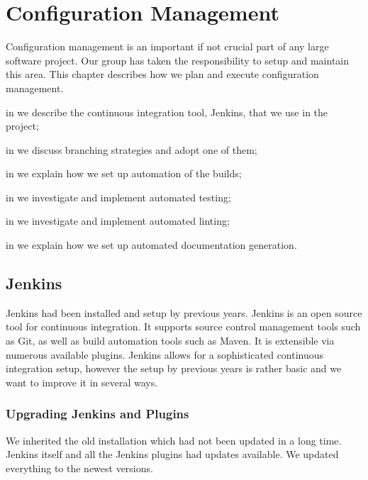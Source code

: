 \chapter{Configuration Management}\label{chap:config_management}
Configuration management is an important if not crucial part of any large software project. Our group has taken the responsibility to setup and maintain this area. This chapter describes how we plan and execute configuration management. \dummy~\dummy~\dummy~\dummy~\dummy~\dummy

\begin{chapterorganization}
  \item in  we describe the continuous integration tool, Jenkins, that we use in the project;
  \item in  we discuss branching strategies and adopt one of them;
  \item in  we explain how we set up automation of the builds;
  \item in  we investigate and implement automated testing;
  \item in  we investigate and implement automated linting;
  \item in  we explain how we set up automated documentation generation.
\end{chapterorganization}

\section{Jenkins}\label{sec:jenkins}
Jenkins had been installed and setup by previous years. Jenkins is an open source tool for continuous integration. It supports source control management tools such as Git, as well as build automation tools such as Maven. It is extensible via numerous available plugins. Jenkins allows for a sophisticated continuous integration setup, however the setup by previous years is rather basic and we want to improve it in several ways.

\subsection{Upgrading Jenkins and Plugins}
We inherited the old installation which had not been updated in a long time. Jenkins itself and all the Jenkins plugins had updates available. We updated everything to the newest versions.

